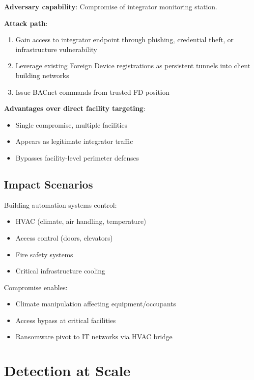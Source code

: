 \documentclass[11pt,a4paper]{article}
\begin{document}
\textbf{Adversary capability}: Compromise of integrator monitoring station.

\textbf{Attack path}:
\begin{enumerate}
  \item Gain access to integrator endpoint through phishing, credential 
    theft, or infrastructure vulnerability
  \item Leverage existing Foreign Device registrations as persistent 
    tunnels into client building networks
  \item Issue BACnet commands from trusted FD position
\end{enumerate}

\textbf{Advantages over direct facility targeting}:
\begin{itemize}
  \item Single compromise, multiple facilities
  \item Appears as legitimate integrator traffic
  \item Bypasses facility-level perimeter defenses
\end{itemize}

\subsection{Impact Scenarios}

Building automation systems control:
\begin{itemize}
  \item HVAC (climate, air handling, temperature)
  \item Access control (doors, elevators)
  \item Fire safety systems
  \item Critical infrastructure cooling
\end{itemize}

Compromise enables:
\begin{itemize}
  \item Climate manipulation affecting equipment/occupants
  \item Access bypass at critical facilities
  \item Ransomware pivot to IT networks via HVAC bridge
\end{itemize}

\section{Detection at Scale}
\label{sec:detection}
\end{document}
